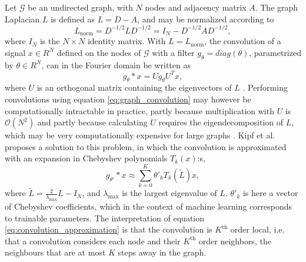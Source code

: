 Let $\mathcal{G}$ be an undirected graph, with $N$ nodes and adjacency matrix $A$. The graph Laplacian $L$ is defined as $L=D-A$, and may be normalized according to
\begin{equation}
    L_\text{norm} = D^{-1/2} L D^{-1/2} =  I_N - D^{-1/2} A D^{-1/2},
    \label{eq:normalized_graph_laplacian}
\end{equation}
where $I_N$ is the $N \times N$ identity matrix. With $L = L_{\text{norm}}$, the convolution of a signal $x \in R^N$ defined on the nodes of $\mathcal{G}$ with a filter $g_\theta = diag(\theta)$, parametrized by $\theta \in R^N$, can in the Fourier domain be written as
\begin{equation}
    g_\theta * x = U g_\theta U^T x,
    \label{eq:graph_convolution}
\end{equation}
where $U$ is an orthogonal matrix containing the eigenvectors of $L$ \cite{kipf_semi_supervised}. Performing convolutions using equation \ref{eq:graph_convolution} may however be computationally intractable in practice, partly because multiplication with $U$ is $\mathcal{O}(N^2)$ and partly because calculating $U$ requires the eigendecomposition of $L$, which may be very computationally expensive for large graphs \cite{kipf_semi_supervised}. Kipf et al. \cite{kipf_semi_supervised} proposes a solution to this problem, in which the convolution is approximated with an expansion in Chebyshev polynomials $T_k(x)$:s,
\begin{equation}
    g_{\theta'} * x \approx \sum_{k=0}^K \theta'_k T_k(\tilde{L})x,
    \label{eq:convolution_approximation}
\end{equation}
where $\tilde{L} =  \frac{2}{\lambda_{\text{max}}}L - I_N$, and $\lambda_{\text{max}}$ is the largest eigenvalue of $L$. $\theta'_k$ is here a vector of Chebyshev coefficients, which in the context of machine learning corresponds to trainable parameters. The interpretation of equation \eqref{eq:convolution_approximation} is that the convolution is $K^{\text{th}}$ order local, i.e. that a convolution considers each node and their $K^{\text{th}}$ order neighbors, the neighbours that are at most $K$ steps away in the graph. 


